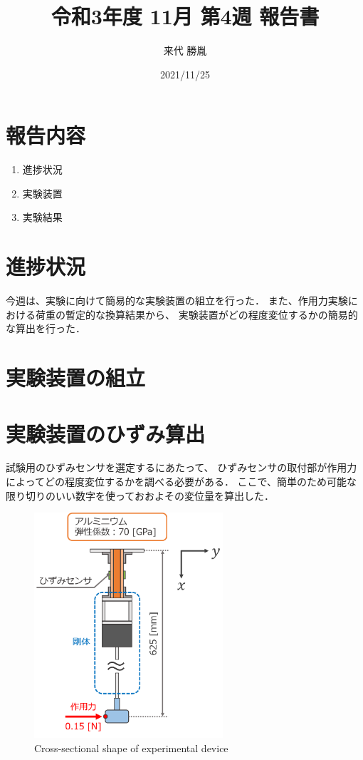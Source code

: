 \documentclass[twocolumn,a4j]{jsarticle}
\author{来代 勝胤}
\title{令和3年度 11月 第4週 報告書}
\date{2021/11/25}
\begin{document}
\columnseprule=0.1mm

\maketitle
\section*{報告内容}
\begin{enumerate}[1.]
    \item 進捗状況
    \item 実験装置
    \item 実験結果
\end{enumerate}

\section{進捗状況}
今週は、実験に向けて簡易的な実験装置の組立を行った．
また、作用力実験における荷重の暫定的な換算結果から、
実験装置がどの程度変位するかの簡易的な算出を行った．
\section{実験装置の組立}
\section{実験装置のひずみ算出}
試験用のひずみセンサを選定するにあたって、
ひずみセンサの取付部が作用力によってどの程度変位するかを調べる必要がある．
ここで、簡単のため可能な限り切りのいい数字を使っておおよその変位量を算出した．
\begin{figure}[htbp]
    \footnotesize
    \begin{center}
        \includegraphics[width=70mm]{../images/moment.png}
        \caption{Cross-sectional shape of experimental device}
    \end{center}
\end{figure}
\end{document}
